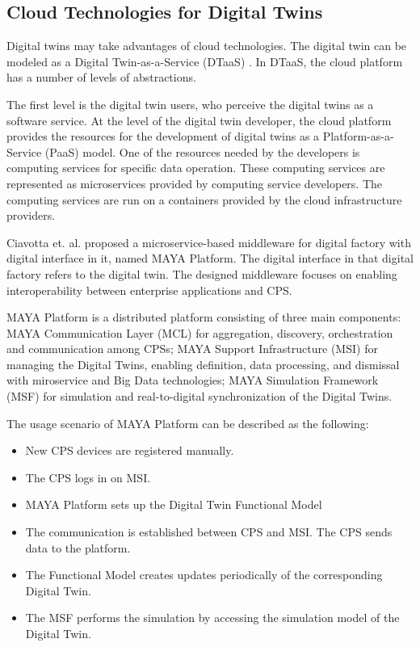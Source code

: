 \documentclass[article]{aaltoseries}
\begin{document}
\subsection{Cloud Technologies for Digital Twins}
Digital twins may take advantages of cloud technologies. The digital twin can be modeled as a Digital Twin-as-a-Service (DTaaS) \cite{borodulin2017towards}. In DTaaS, the cloud platform has a number of levels of abstractions. 

The first level is the digital twin users, who perceive the digital twins as a software service. At the level of the digital twin developer, the cloud platform provides the resources for the development of digital twins as a Platform-as-a-Service (PaaS) model. One of the resources needed by the developers is computing services for specific data operation. These computing services are represented as microservices provided by computing service developers. The computing services are run on a containers provided by the cloud infrastructure providers.

Ciavotta et. al. \cite{ciavotta2017microservice} proposed a microservice-based middleware for digital factory with digital interface in it, named MAYA Platform. The digital interface in that digital factory refers to the digital twin. The designed middleware focuses on enabling interoperability between enterprise applications and CPS.

MAYA Platform is a distributed platform consisting of three main components: MAYA Communication Layer (MCL) for aggregation, discovery, orchestration and communication among CPSs; MAYA Support Infrastructure (MSI) for managing the Digital Twins, enabling definition, data processing, and dismissal with miroservice and Big Data technologies; MAYA Simulation Framework (MSF) for simulation and real-to-digital synchronization of the Digital Twins.

The usage scenario of MAYA Platform can be described as the following:
\begin{itemize}
	\item New CPS devices are registered manually.
	\item The CPS logs in on MSI.
	\item MAYA Platform sets up the Digital Twin Functional Model
	\item The communication is established between CPS and MSI. The CPS sends data to the platform.
	\item The Functional Model creates updates periodically of the corresponding Digital Twin.
	\item The MSF performs the simulation by accessing the simulation model of the Digital Twin.
\end{itemize}
\end{document}
